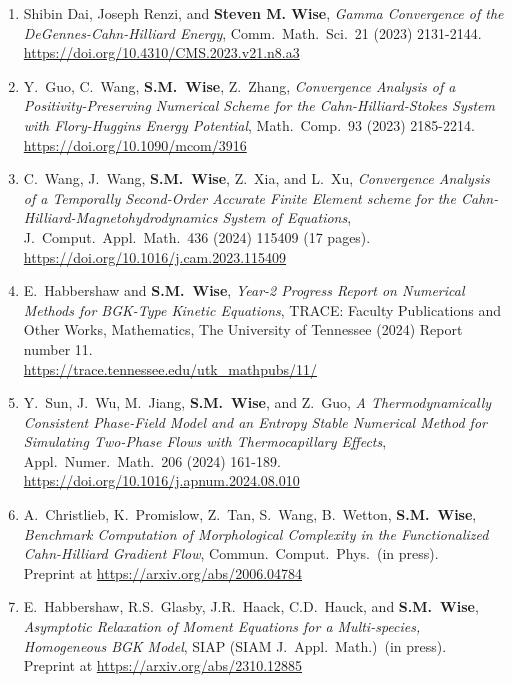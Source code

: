 \documentclass[11pt]{letter}
\begin{document}
\begin{enumerate}
	\item
Shibin Dai, Joseph Renzi, and \textbf{Steven M. Wise}, {\sl Gamma Convergence of the DeGennes-Cahn-Hilliard Energy}, Comm.~Math.~Sci.~21 (2023) 2131-2144. 
	\\
\url{https://doi.org/10.4310/CMS.2023.v21.n8.a3}

	\item
Y.~Guo, C.~Wang, \textbf{S.M.~Wise}, Z.~Zhang, {\sl Convergence Analysis of a Positivity-Preserving Numerical Scheme for the Cahn-Hilliard-Stokes System with Flory-Huggins Energy Potential}, Math.~Comp.~93 (2023) 2185-2214.
	\\
\url{https://doi.org/10.1090/mcom/3916}

	\item
C.~Wang, J.~Wang, \textbf{S.M.~Wise}, Z.~Xia, and L.~Xu, {\sl Convergence Analysis of a Temporally Second-Order Accurate Finite Element scheme for the Cahn-Hilliard-Magnetohydrodynamics System of Equations}, J.~Comput.~Appl.~Math.~436 (2024) 115409 (17 pages).
	\\
\url{https://doi.org/10.1016/j.cam.2023.115409}

	\item
E.~Habbershaw and \textbf{S.M.~Wise}, {\sl Year-2 Progress Report on Numerical Methods for BGK-Type Kinetic Equations}, TRACE: Faculty Publications and Other Works, Mathematics, The University of Tennessee (2024) Report number 11.
 	\\
\url{https://trace.tennessee.edu/utk_mathpubs/11/}

	\item
Y.~Sun, J.~Wu, M.~Jiang, \textbf{S.M.~Wise}, and Z.~Guo, {\sl A Thermodynamically Consistent Phase-Field Model and an Entropy Stable Numerical Method for Simulating Two-Phase Flows with Thermocapillary Effects}, Appl.~Numer.~Math.~206 (2024) 161-189.
	\\
\url{https://doi.org/10.1016/j.apnum.2024.08.010}

	\item
A.~Christlieb, K.~Promislow, Z.~Tan, S.~Wang, B.~Wetton, \textbf{S.M.~Wise}, {\sl Benchmark Computation of Morphological Complexity in the Functionalized Cahn-Hilliard Gradient Flow}, Commun.~Comput.~Phys.~(in press).
	\\ 
Preprint at \url{https://arxiv.org/abs/2006.04784}


	\item
E.~Habbershaw, R.S.~Glasby, J.R.~Haack, C.D.~Hauck, and \textbf{S.M.~Wise}, {\sl Asymptotic Relaxation of Moment Equations for a Multi-species, Homogeneous BGK Model}, SIAP (SIAM J.~Appl.~Math.)~(in press).
	\\
Preprint at \url{https://arxiv.org/abs/2310.12885}


\end{enumerate}
\end{document}
